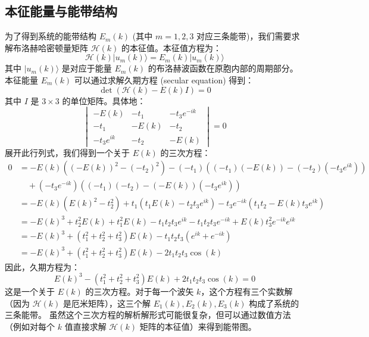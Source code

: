 \documentclass[UTF-8]{ctexart}
\begin{document}
\subsection{本征能量与能带结构}
为了得到系统的能带结构 $E_m(k)$ (其中 $m=1, 2, 3$ 对应三条能带)，我们需要求解布洛赫哈密顿量矩阵 $\mathcal{H}(k)$ 的本征值。本征值方程为：
\[ \mathcal{H}(k) |u_m(k)\rangle = E_m(k) |u_m(k)\rangle \]
其中 $|u_m(k)\rangle$ 是对应于能量 $E_m(k)$ 的布洛赫波函数在原胞内部的周期部分。
本征能量 $E_m(k)$ 可以通过求解久期方程 (secular equation) 得到：
\[ \det(\mathcal{H}(k) - E(k)I) = 0 \]
其中 $I$ 是 $3 \times 3$ 的单位矩阵。具体地：
\[
\begin{vmatrix}
-E(k) & -t_1 & -t_3 e^{-ik} \\
-t_1 & -E(k) & -t_2 \\
-t_3 e^{ik} & -t_2 & -E(k)
\end{vmatrix} = 0
\]
展开此行列式，我们得到一个关于 $E(k)$ 的三次方程：
\begin{align*}
0 &= -E(k) \left( (-E(k))^2 - (-t_2)^2 \right) - (-t_1) \left( (-t_1)(-E(k)) - (-t_2)(-t_3 e^{ik}) \right) \\
  &\quad + (-t_3 e^{-ik}) \left( (-t_1)(-t_2) - (-E(k))(-t_3 e^{ik}) \right) \\
  &= -E(k)(E(k)^2 - t_2^2) + t_1 (t_1 E(k) - t_2 t_3 e^{ik}) - t_3 e^{-ik} (t_1 t_2 - E(k)t_3 e^{ik}) \\
  &= -E(k)^3 + t_2^2 E(k) + t_1^2 E(k) - t_1 t_2 t_3 e^{ik} - t_1 t_2 t_3 e^{-ik} + E(k) t_3^2 e^{-ik}e^{ik} \\
  &= -E(k)^3 + (t_1^2 + t_2^2 + t_3^2)E(k) - t_1 t_2 t_3 (e^{ik} + e^{-ik}) \\
  &= -E(k)^3 + (t_1^2 + t_2^2 + t_3^2)E(k) - 2 t_1 t_2 t_3 \cos(k)
\end{align*}
因此，久期方程为：
\[ E(k)^3 - (t_1^2 + t_2^2 + t_3^2)E(k) + 2 t_1 t_2 t_3 \cos(k) = 0 \]
这是一个关于 $E(k)$ 的三次方程。对于每一个波矢 $k$，这个方程有三个实数解（因为 $\mathcal{H}(k)$ 是厄米矩阵），这三个解 $E_1(k), E_2(k), E_3(k)$ 构成了系统的三条能带。
虽然这个三次方程的解析解形式可能很复杂，但可以通过数值方法（例如对每个 $k$ 值直接求解 $\mathcal{H}(k)$ 矩阵的本征值）来得到能带图。
\end{document}
